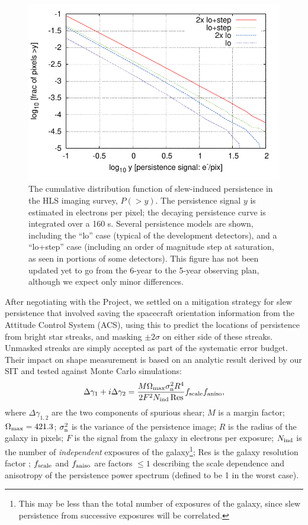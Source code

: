 \begin{figure}
\includegraphics[width=5in]{Plots/sp_cdf.pdf}
\caption{\label{fig:sp_cdf}The cumulative distribution function of slew-induced persistence in the HLS imaging survey, $P(>y)$.
The persistence signal $y$ is estimated in electrons per pixel; the decaying persistence curve is integrated over a 160 s. Several persistence models are shown, including the ``lo'' case (typical of the development detectors), and a ``lo+step'' case (including an order of magnitude step at saturation, as seen in portions of some detectors). This figure has not been updated yet to go from the 6-year to the 5-year observing plan, although we expect only minor differences.}
\end{figure}

After negotiating with the Project, we settled on a mitigation strategy for slew persistence that involved saving the spacecraft orientation information from the Attitude Control System (ACS), using this to predict the locations of persistence from bright star streaks, and masking $\pm2\sigma$ on either side of these streaks. Unmasked streaks are simply accepted as part of the systematic error budget. Their impact on shape measurement is based on an analytic result derived by our SIT and tested against Monte Carlo simulations:
\begin{equation}
\Delta \gamma_1 + i\Delta \gamma_2 = \frac{M\Omega_{\rm
max}\sigma_{\rm n}^2 R^4}{2F^2N_{\rm ind}\,{\rm Res}} f_{\rm scale}
f_{\rm aniso},
\label{eq:dg}
\end{equation}
where $\Delta\gamma_{1,2}$ are the two components of spurious shear; $M$ is a margin factor; $\Omega_{\rm max} = 421.3$; $\sigma_{\rm n}^2$ is the variance of the persistence image; $R$ is the radius of the galaxy in pixels; $F$ is the signal from the galaxy in electrons per exposure; $N_{\rm ind}$ is the number of {\em independent} exposures of the galaxy\footnote{This may be less than the total number of exposures of the galaxy, since slew persistence from successive exposures will be correlated.}; Res is the galaxy resolution factor \cite{Bernstein2002}; $f_{\rm scale}$ and $f_{\rm aniso}$ are factors $\le 1$ describing the scale dependence and anisotropy of the persistence power spectrum (defined to be 1 in the worst case).

